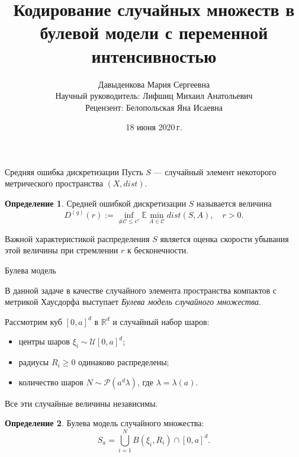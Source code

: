 \documentclass[aspectratio=1610]{beamer}
\title[Short title]{Кодирование случайных множеств в булевой модели с переменной интенсивностью} %
\author{Давыденкова Мария Сергеевна\\\medskip
Научный руководитель: Лифшиц Михаил Анатольевич \\
Рецензент: Белопольская Яна Исаевна}
\institute[SPBU] 
{
Санкт-Петербургский государственный университет
\medskip
}
\date{18 июня 2020\,г.} %
\theoremstyle{plain}
\theoremstyle{definition}
\newtheorem*{defn}{Определение}
\theoremstyle{remark}
\def\geq{\geqslant}
\def\leq{\leqslant}
\newcommand{\cuplim}{\bigcup\limits}
\newcommand{\R}{\mathbb{R}}
\newcommand{\E}{\mathbb{E}}
\begin{document}
\begin{frame}
\titlepage %
\end{frame}

\begin{frame}{Средняя ошибка дискретизации}
Пусть $S$  ---  случайный элемент некоторого метрического пространства $(X, dist)$.

\begin{defn}
Средней ошибкой дискретизации $S$ называется величина  $$D^{(q)}(r) := \inf\limits_{\#\mathcal{C}\leq e^r}\E \min\limits_{A\in\mathcal{C}}dist(S, A), \quad r>0.$$
\end{defn}{}

Важной характеристикой распределения $S$ является оценка скорости убывания этой величины при стремлении $r$ к бесконечности.

\end{frame}

\begin{frame}{Булева модель}

В данной задаче в качестве случайного элемента пространства компактов с метрикой Хаусдорфа выступает {\it Булева модель случайного множества}.
\medskip

Рассмотрим куб $[0,a]^d$ в $\R^d$ и  случайный набор шаров: 
\begin{itemize}
    \item центры шаров $\xi_i \sim \mathcal{U}[0, a]^d$;
    \item радиусы $R_i \geq 0$ одинаково распределены;
    \item  количество шаров $N\sim\mathcal{P}(a^d\lambda)$, где $\lambda = \lambda(a)$.
\end{itemize}   
Все эти случайные величины независимы. 

\begin{defn}
Булева модель случайного множества:
$$S_a = \cuplim_{i=1}^N B(\xi_i, R_i) \cap [0,a]^d.$$
\end{defn}


    
\end{frame}
\end{document}
